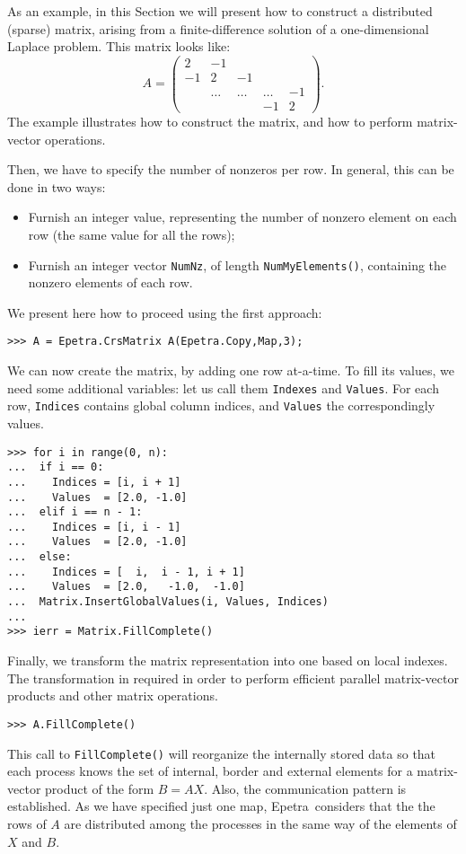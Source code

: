 \documentclass[10pt,relax]{SANDreport}
\newcommand{\epetra}{{Epetra}}
\begin{document}
As an example, in this Section we will present how to construct a
distributed (sparse) matrix, arising from a finite-difference solution
of a one-dimensional Laplace problem. This matrix looks like:
\begin{equation*}
A = \begin{pmatrix}
 2 & -1 &     &   &    \\
-1 &  2     & -1     &        &    \\
   & \ldots & \ldots & \ldots & -1 \\
   &        &        & -1     & 2
\end{pmatrix}.
\end{equation*}
The example illustrates how to construct the matrix,
and how to perform matrix-vector operations.

Then, we have to specify the number
of nonzeros per row. In general, this can be done in two ways:
\begin{itemize}
\item Furnish an integer value, representing the number of nonzero
  element on each row (the same value for all the rows);
\item Furnish an integer vector \verb!NumNz!, of length
  \verb!NumMyElements()!, containing the nonzero elements of each row.
\end{itemize}

We present here how to proceed using the first approach:
\begin{verbatim}
>>> A = Epetra.CrsMatrix A(Epetra.Copy,Map,3);
\end{verbatim}
We can now create the matrix, by adding one row at-a-time.
To fill its values, we
need some additional variables: let us call them \verb!Indexes! and
\verb!Values!. For each row, \verb!Indices! contains global column
indices, and \verb!Values! the correspondingly values.
\begin{verbatim}
>>> for i in range(0, n):
...  if i == 0:
...    Indices = [i, i + 1]
...    Values  = [2.0, -1.0]
...  elif i == n - 1:
...    Indices = [i, i - 1]
...    Values  = [2.0, -1.0]
...  else:
...    Indices = [  i,  i - 1, i + 1]
...    Values  = [2.0,   -1.0,  -1.0]
...  Matrix.InsertGlobalValues(i, Values, Indices)
...
>>> ierr = Matrix.FillComplete()
\end{verbatim}
Finally, we
transform the matrix representation into one based on local indexes. The
transformation in required in order to perform efficient parallel
matrix-vector products and other matrix operations.
\begin{verbatim}
>>> A.FillComplete()
\end{verbatim}
This call to \verb!FillComplete()! will reorganize the internally stored
data so that each process knows the set of internal, border and external
elements for a matrix-vector product of the form $B = AX$. Also, the
communication pattern is established. As we have specified just one map,
\epetra\ considers that the the rows of $A$ are distributed among the
processes in the same way of the elements of $X$ and $B$.
\end{document}
